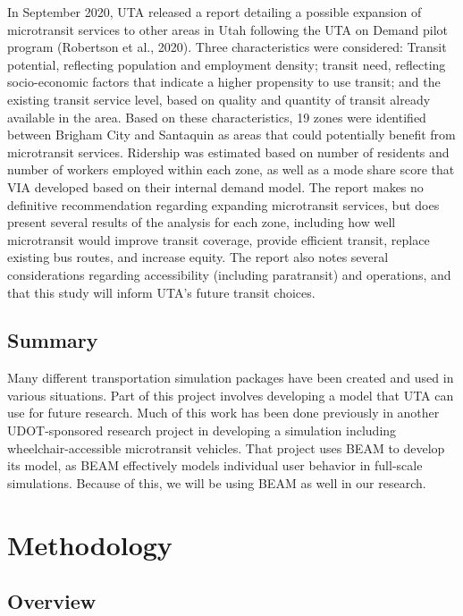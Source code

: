\documentclass[
]{article}
\begin{document}
In September 2020, UTA released a report detailing a possible expansion of microtransit services to other areas in Utah following the UTA on Demand pilot program (Robertson et al., 2020). Three characteristics were considered: Transit potential, reflecting population and employment density; transit need, reflecting socio-economic factors that indicate a higher propensity to use transit; and the existing transit service level, based on quality and quantity of transit already available in the area. Based on these characteristics, 19 zones were identified between Brigham City and Santaquin as areas that could potentially benefit from microtransit services. Ridership was estimated based on number of residents and number of workers employed within each zone, as well as a mode share score that VIA developed based on their internal demand model. The report makes no definitive recommendation regarding expanding microtransit services, but does present several results of the analysis for each zone, including how well microtransit would improve transit coverage, provide efficient transit, replace existing bus routes, and increase equity. The report also notes several considerations regarding accessibility (including paratransit) and operations, and that this study will inform UTA's future transit choices.

\hypertarget{summary}{%
\subsection{Summary}\label{summary}}

Many different transportation simulation packages have been created and used in various situations. Part of this project involves developing a model that UTA can use for future research. Much of this work has been done previously in another UDOT-sponsored research project in developing a simulation including wheelchair-accessible microtransit vehicles. That project uses BEAM to develop its model, as BEAM effectively models individual user behavior in full-scale simulations. Because of this, we will be using BEAM as well in our research.

\hypertarget{methodology}{%
\section{Methodology}\label{methodology}}

\hypertarget{overview-1}{%
\subsection{Overview}\label{overview-1}}
\end{document}
